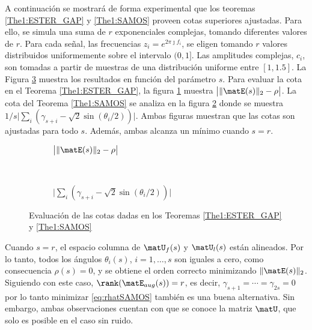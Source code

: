 A continuación se mostrará de forma experimental que los teoremas \ref{The1:ESTER_GAP} y \ref{The1:SAMOS} proveen cotas superiores ajustadas. Para ello, se simula una suma de $r$ exponenciales complejas, tomando diferentes valores de $r$. Para cada señal, las frecuencias $z_i=e^{2\pi\jmath f_i}$, se eligen tomando $r$ valores distribuidos uniformemente sobre el intervalo $(0,1]$. Las amplitudes complejas, $c_i$, son tomadas a partir de muestras de una distribución uniforme entre $[1, 1.5]$. La Figura \ref{Fig:BoundsAngles} muestra los resultados en función del parámetro $s$. Para evaluar la cota en el Teorema \eqref{The1:ESTER_GAP}, la figura \ref{Fig:ESTER_angles} muestra $\big|\|\matE(s)\|_2 - \rho\big|$. La cota del Teorema \eqref{The1:SAMOS} se analiza en la figura \ref{Fig:SAMOS_angles} donde se muestra $1/s\big|\sum_i(\gamma_{s+i}-\sqrt{2}\sin(\theta_i/2))\big|$. Ambas figuras muestran que las cotas son ajustadas para todo $s$. Además, ambas alcanza un mínimo cuando $s=r$.

\begin{figure}[t]
	\centering
	\begin{subfigure}{0.45\textwidth}
		\centering
		\resizebox{\linewidth}{!}{}
		\caption{$\big|\|\matE(s)\|_2 - \rho\big|$}
		\label{Fig:ESTER_angles}
	\end{subfigure}
	~
	\begin{subfigure}{0.45\textwidth}
		\centering
		\resizebox{\linewidth}{!}{}
		\caption{$\big|\sum_i(\gamma_{s+i}-\sqrt{2}\sin(\theta_i/2))\big|$}
		\label{Fig:SAMOS_angles} 
	\end{subfigure} 
	\caption{Evaluación de las cotas dadas en los Teoremas \eqref{The1:ESTER_GAP} y \eqref{The1:SAMOS}}
	\label{Fig:BoundsAngles}
\end{figure}

Cuando $s=r$, el espacio columna de $\matU_f(s)$ y $\matU_l(s)$ están alineados. Por lo tanto, todos los ángulos $\theta_i(s)$, $i = 1,\ldots,s$ son iguales a cero, como consecuencia $\rho(s)=0$, y se obtiene el orden correcto minimizando $\|\matE(s)\|_2$. Siguiendo con este caso, $\rank(\matE_{aug}(s)) = r$, es decir, $\gamma_{s+1} = \cdots = \gamma_{2s}=0$ por lo tanto minimizar \eqref{eq:rhatSAMOS} también es una buena alternativa. Sin embargo, ambas observaciones cuentan con que se conoce  la matriz $\matU$, que solo es posible en el caso sin ruido.

